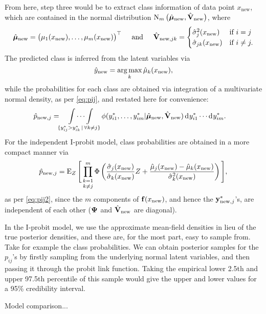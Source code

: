 From here, step three would be to extract class information of data point $x_\text{new}$, which are contained in the normal distribution $\operatorname{N}_{m}\big(\hat{{\bm\mu}}_{\text{new}}, \hat{{\mathbf V}}_{\text{new}} \big)$, where
\begin{equation*}
  \hat{{\bm\mu}}_{\text{new}} = \big(\mu_1(x_\text{new}),\dots, \mu_m(x_\text{new}) \big)^\top 
  \hspace{0.5cm}\text{and}\hspace{0.5cm}
  \hat{{\mathbf V}}_{{\text{new}},jk} = 
  \begin{cases}
    \hat\sigma_j^2(x_\text{new}) & \text{if } i = j \\
    \hat\sigma_{jk}(x_\text{new}) & \text{if } i \neq j. \\
  \end{cases}
\end{equation*}
The predicted class is inferred from the latent variables via
\[
  \hat y_{\text{new}} = \operatorname*{arg\,max}_k \hat\mu_k(x_{\text{new}}), 
\]
while the probabilities for each class are obtained via integration of a multivariate normal density, as per \cref{eq:pij}, and restated here for convenience:
\begin{align*}
  \hat p_{\text{new},j} 
  &=  \idotsint\displaylimits_{\{y_{ij}^* > y_{ik}^* \,|\, \forall k \neq j\}} \phi(y_{i1}^*, \dots, y_{im}^*|\hat{{\bm\mu}}_{\text{new}}, \hat{{\mathbf V}}_{{\text{new}}}) \operatorname{d}\hspace{0.5pt}\! y_{i1}^* \cdots \operatorname{d}\hspace{0.5pt}\! y_{im}^*.
\end{align*}
For the independent I-probit model, class probabilities are obtained in a more compact manner via
\[
  \hat p_{\text{new},j} 
  = \operatorname{E}_Z \Bigg[ \mathop{\prod_{k=1}^m}_{k\neq j} 
  \Phi \left(\frac{\hat\sigma_j(x_\text{new})}{\hat\sigma_k(x_\text{new})} Z + \frac{\hat\mu_j(x_{\text{new}}) - \hat\mu_k(x_{\text{new}})}{\hat\sigma_k^2(x_\text{new})} \right) \Bigg],
\]
as per \cref{eq:pij2}, since the $m$ components of ${\mathbf f}(x_{\text{new}})$, and hence the ${\mathbf y}^*_{{\text{new}},j}$'s, are independent of each other (${\bm\Psi}$ and $\hat{{\mathbf V}}_{\text{new}}$ are diagonal).










In the I-probit model, we use the approximate mean-field densities in lieu of the true posterior densities, and these are, for the most part, easy to sample from.
Take for example the class probabilities. 
We can obtain posterior samples for the $p_{ij}$'s by firstly sampling from the underlying normal latent variables, and then passing it through the probit link function.
Taking the empirical lower 2.5th and upper 97.5th percentile of this sample would give the upper and lower values for a 95\% credibility interval.

Model comparison...

